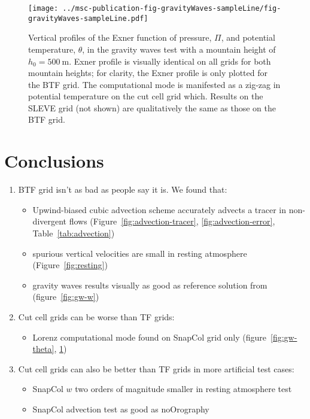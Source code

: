 \documentclass[twocol]{ametsoc}
\begin{document}
\begin{figure}
	\centering
	\texttt{[image: ../msc-publication-fig-gravityWaves-sampleLine/fig-gravityWaves-sampleLine.pdf]}
%
	\caption{Vertical profiles of the Exner function of pressure, \(\Pi\), and potential temperature, \(\theta\), in the gravity waves test with a mountain height of \(h_0 = \SI{500}{\meter}\).  Exner profile is visually identical on all grids for both mountain heights; for clarity, the Exner profile is only plotted for the BTF grid.  The computational mode is manifested as a zig-zag in potential temperature on the cut cell grid which.   Results on the SLEVE grid (not shown) are qualitatively the same as those on the BTF grid.}
	\label{fig:gw-exner-theta}
\end{figure}


\section{Conclusions}
\begin{enumerate}
	\item BTF grid isn't as bad as people say it is.  We found that:
	\begin{itemize}
		\item Upwind-biased cubic advection scheme accurately advects a tracer in non-divergent flows (Figure~\ref{fig:advection-tracer}, \ref{fig:advection-error}, Table~\ref{tab:advection})
		\item spurious vertical velocities are small in resting atmosphere (Figure~\ref{fig:resting})
		\item gravity waves results visually as good as reference solution from \citet{melvin2010} (figure~\ref{fig:gw-w})
	\end{itemize}

	\item Cut cell grids can be worse than TF grids:
	\begin{itemize}
		\item Lorenz computational mode found on SnapCol grid only (figure~\ref{fig:gw-theta}, \ref{fig:gw-exner-theta})
	\end{itemize}

	\item Cut cell grids can also be better than TF grids in more artificial test cases:
	\begin{itemize}
		\item SnapCol $w$ two orders of magnitude smaller in resting atmosphere test
		\item SnapCol advection test as good as noOrography
	\end{itemize}
\end{enumerate}
\end{document}
